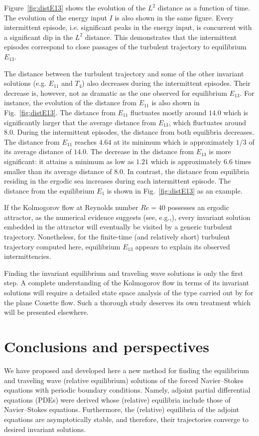 \documentclass{jfm}
\begin{document}
Figure~\ref{fig:distE13} shows the evolution of the $L^2$ distance
as a function of time. The evolution of the energy input $I$ is
also shown in the same figure. Every intermittent episode, i.e. significant peaks
in the energy input, is concurrent with a significant dip in the $L^2$ distance.
This demonstrates that the intermittent episodes correspond to
close passages of the turbulent trajectory to equilibrium $E_{13}$.

The distance between the turbulent trajectory and some of the other invariant
solutions (e.g. $E_{11}$ and $T_4$) also decreases during the intermittent episodes.
Their decrease is, however, not as dramatic as the one observed for equilibrium $E_{13}$.
For instance, the evolution of the distance from $E_{11}$ is also
shown in Fig.~\ref{fig:distE13}. The distance from $E_{11}$ fluctuates mostly around $14.0$ 
which is significantly larger that the average distance from $E_{13}$, which fluctuates around $8.0$.
During the intermittent episodes, the distance from both equilibria decreases. The distance from 
$E_{11}$ reaches $4.64$ at its minimum which is approximately $1/3$ of its average distance 
of $14.0$. The decrease in the distance from $E_{13}$ is more significant: it attains a minimum as low
as $1.21$ which is approximately $6.6$ times smaller than its average distance of $8.0$.
In contrast, the distance from equilibria residing in the ergodic sea increases during each intermittent episode.
The distance from the equilibrium $E_1$ is shown in Fig.~\ref{fig:distE13} as an example.

If the Kolmogorov flow at Reynolds number $Re=40$ possesses an ergodic attractor,
as the numerical evidence suggests (see, e.g.,),
every invariant solution embedded in the attractor will
eventually be visited by a generic turbulent trajectory.
Nonetheless, for the finite-time (and relatively short)
turbulent trajectory computed here, equilibrium $E_{13}$ appears to explain its
observed intermittencies.

Finding the invariant equilibrium and traveling wave solutions is only the first step.
A complete understanding of the Kolmogorov flow in terms of its invariant solutions
will require a detailed state space analysis of the type carried out by for
the plane Couette flow. Such a thorough study deserves its own treatment which will be
presented elsewhere.

\section{Conclusions and perspectives}
\label{sec:conclude}
We have  proposed and developed here a new
method for finding the equilibrium and traveling wave (relative
equilibrium) solutions of
the forced Navier--Stokes equations with periodic boundary conditions.
Namely, adjoint partial differential equations (PDEs) were derived whose (relative) equilibria
include those of Navier--Stokes equations. Furthermore, the (relative) equilibria of the adjoint
equations are asymptotically stable, and therefore, their trajectories converge to desired
invariant
solutions.
\end{document}
